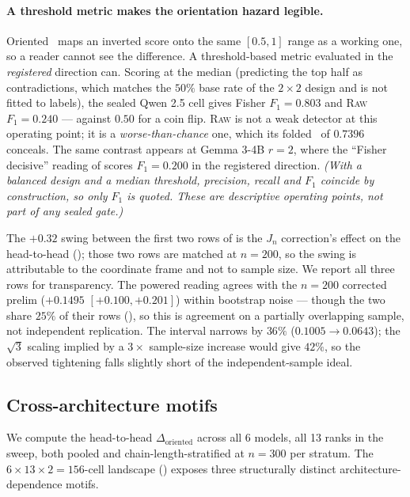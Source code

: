 \documentclass[10pt, letterpaper]{article}
\newcommand{\Jn}{J_n}
\newcommand{\auroc}{\text{AUROC}}
\newcommand{\Doriented}{\Delta_{\text{oriented}}}
\begin{document}
\paragraph{A threshold metric makes the orientation hazard legible.}
Oriented \auroc\ maps an inverted score onto the same $[0.5, 1]$ range
as a working one, so a reader cannot see the difference. A
threshold-based metric evaluated in the \emph{registered} direction
can. Scoring at the median (predicting the top half as contradictions,
which matches the $50\%$ base rate of the $2\times2$ design and is not
fitted to labels), the sealed Qwen 2.5 cell gives Fisher $F_1 = 0.803$
and \textsc{Raw} $F_1 = \mathbf{0.240}$ --- against $0.50$ for a coin
flip. \textsc{Raw} is not a weak detector at this operating point; it
is a \emph{worse-than-chance} one, which its folded \auroc\ of $0.7396$
conceals. The same contrast appears at Gemma 3-4B $r=2$, where the
``Fisher decisive'' reading of  scores $F_1 =
0.200$ in the registered direction. \emph{(With a balanced design and a
median threshold, precision, recall and $F_1$ coincide by
construction, so only $F_1$ is quoted. These are descriptive operating
points, not part of any sealed gate.)}

The $+0.32$ swing between the first two rows of  is the
$\Jn$ correction's effect on the head-to-head
(); those two rows are matched at $n=200$, so the
swing is attributable to the coordinate frame and not to sample size.
We report all three rows for transparency. The powered reading
agrees with the $n=200$ corrected prelim ($+0.1495$ $[+0.100, +0.201]$)
within bootstrap noise --- though the two share $25\%$ of their rows
(), so this is agreement on a partially
overlapping sample, not independent replication. The interval narrows by $36\%$
($0.1005 \to 0.0643$); the $\sqrt{3}$ scaling implied by a $3\times$
sample-size increase would give $42\%$, so the observed tightening
falls slightly short of the independent-sample ideal.

\subsection{Cross-architecture motifs}
\label{sec:results:motifs}

We compute the head-to-head $\Doriented$ across all 6 models, all 13
ranks in the sweep, both pooled and chain-length-stratified at $n=300$
per stratum. The $6\times 13\times 2 = 156$-cell landscape
() exposes three structurally distinct
architecture-dependence motifs.
\end{document}
